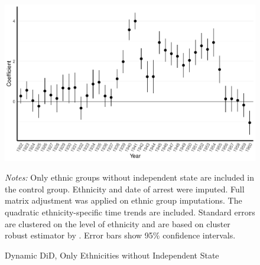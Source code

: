  \begin{figure}[H]
\centering
\caption{Dynamic DiD, Only Ethnicities without Independent State}
\includegraphics[width=\textwidth]{plots/final/pr_cr2_date_imp_full_years_no_trends_not_ind_country.pdf}
\begin{minipage}{0.92\textwidth}
\footnotesize
\emph{Notes:} Only ethnic groups without independent state are included in the control group. Ethnicity and date of arrest were imputed.  Full matrix adjustment was applied on ethnic group imputations. The quadratic ethnicity-specific time trends are included.  Standard errors are clustered on the level of ethnicity and are based on cluster robust estimator by \citet{pustejovsky_small-sample_2018}. Error bars show 95\% confidence intervals. 
\end{minipage}
\label{fig:did_effets_no_ind_countries}
\end{figure}

